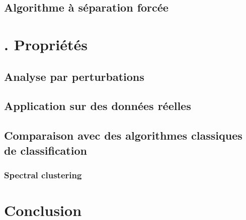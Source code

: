 \documentclass[12pt,a4paper]{report}
\begin{document}
\section{Algorithme à séparation forcée}

\chapter*{\thechapter . Propriétés}

\section{Analyse par perturbations}

\section{Application sur des données réelles}

\section{Comparaison avec des algorithmes classiques de classification}

\subsection*{Spectral clustering}

\chapter*{Conclusion}

\nocite{vandongen00}


\end{document}
